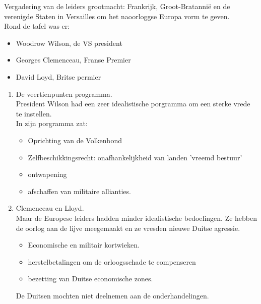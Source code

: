 \documentclass{article}
\begin{document}
Vergadering van de leiders grootmacht: Frankrijk, Groot-Bratannië en de verenigde Staten in Versailles om het naoorloggse Europa vorm te geven.\\
Rond de tafel was er:
\begin{itemize}
    \item Woodrow Wilson, de VS president
    \item Georges Clemenceau, Franse Premier
    \item David Loyd, Britse permier
\end{itemize}
\begin{enumerate}
    \item De veertienpunten programma.\\
    President Wilson had een zeer idealistische porgramma om een sterke vrede te instellen.\\
    In zijn porgramma zat:
    \begin{itemize}
        \item Oprichting van de Volkenbond
        \item Zelfbeschikkingsrecht: onafhankelijkheid van landen 'vreemd bestuur'
        \item ontwapening
        \item afschaffen van militaire allianties.
    \end{itemize}
    \item Clemenceau en Lloyd.\\
    Maar de Europese leiders hadden minder idealistische bedoelingen. Ze hebben de oorlog aan de lijve meegemaakt en ze vresden nieuwe Duitse agressie.\\
    \begin{itemize}
        \item Economische en militair kortwieken.
        \item herstelbetalingen om de orloogsschade te compenseren
        \item bezetting van Duitse economische zones.
    \end{itemize}
    De Duitsen mochten niet deelnemen aan de onderhandelingen.
\end{enumerate}
\end{document}
